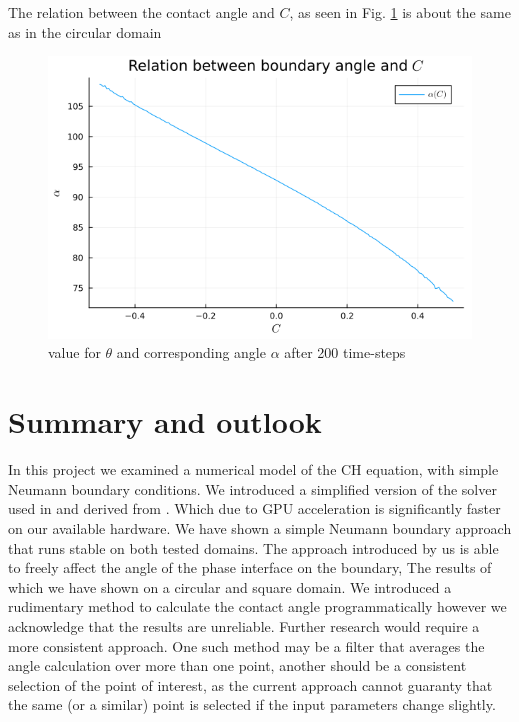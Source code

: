 \documentclass{mimosis}
\begin{document}
The relation between the contact angle and \(C\), as seen in Fig. \ref{fig:angle-table-square} is about the same as in the circular domain
\begin{figure}[htbp]
\centering
\includegraphics[width=.9\linewidth]{images/angle-values-square.png}
\caption{\label{fig:angle-table-square}value for \(\theta\) and corresponding angle \(\alpha\) after 200 time-steps}
\end{figure}
\chapter{Summary and outlook}
\label{sec:orgbd2a86c}
In this project we examined a numerical model of the CH equation, with simple Neumann boundary conditions. We introduced a simplified version of the solver used in \autocite{Ulmer_CHRelaxed_2024} and derived from \autocite{SHIN20117441}. Which due to GPU acceleration is significantly faster on our available hardware. We have shown a simple Neumann boundary approach that runs stable on both tested domains. The approach introduced by us is able to freely affect the angle of the phase interface on the boundary, The results of which we have shown on a circular and square domain. We introduced a rudimentary method to calculate the contact angle programmatically however we acknowledge that the results are unreliable. Further research would require a more consistent approach. One such method may be a filter that averages the angle calculation over more than one point, another should be a consistent selection of the point of interest, as the current approach cannot guaranty that the same (or a similar) point is selected if the input parameters change slightly.
\end{document}
